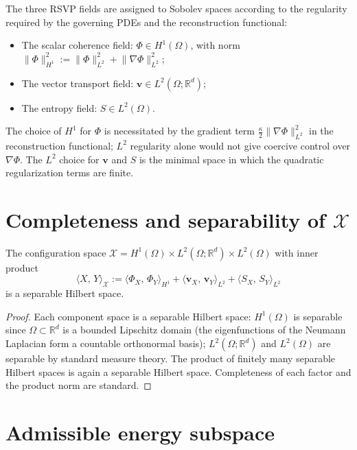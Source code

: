 \documentclass[12pt, oneside]{memoir}
\newcommand{\X}{\mathcal{X}}
\newcommand{\nnorm}[1]{\lVert #1 \rVert}
\newcommand{\ip}[2]{\langle #1,\, #2 \rangle}
\newcommand{\bv}{\mathbf{v}}
\begin{document}
The three RSVP fields are assigned to Sobolev spaces according to the regularity required
by the governing PDEs and the reconstruction functional:
\begin{itemize}
  \item The scalar coherence field: $\Phi \in H^1(\Omega)$, with norm
        $\nnorm{\Phi}_{H^1}^2 := \nnorm{\Phi}_{L^2}^2 + \nnorm{\nabla\Phi}_{L^2}^2$;
  \item The vector transport field: $\bv \in L^2(\Omega;\mathbb{R}^d)$;
  \item The entropy field: $S \in L^2(\Omega)$.
\end{itemize}
The choice of $H^1$ for $\Phi$ is necessitated by the gradient term $\frac{\kappa}{2}
\nnorm{\nabla\Phi}_{L^2}^2$ in the reconstruction functional; $L^2$ regularity alone
would not give coercive control over $\nabla\Phi$.  The $L^2$ choice for $\bv$ and $S$
is the minimal space in which the quadratic regularization terms are finite.

\section{Completeness and separability of $\X$}

\begin{proposition}[Hilbert space structure of $\X$]
\label{prop:X-hilbert}
The configuration space $\X = H^1(\Omega) \times L^2(\Omega;\mathbb{R}^d) \times
L^2(\Omega)$ with inner product
\[
  \ip{X}{Y}_\X := \ip{\Phi_X}{\Phi_Y}_{H^1} + \ip{\bv_X}{\bv_Y}_{L^2}
                  + \ip{S_X}{S_Y}_{L^2}
\]
is a separable Hilbert space.
\end{proposition}

\begin{proof}
Each component space is a separable Hilbert space: $H^1(\Omega)$ is separable since
$\Omega \subset \mathbb{R}^d$ is a bounded Lipschitz domain (the eigenfunctions of the
Neumann Laplacian form a countable orthonormal basis); $L^2(\Omega;\mathbb{R}^d)$ and
$L^2(\Omega)$ are separable by standard measure theory.  The product of finitely many
separable Hilbert spaces is again a separable Hilbert space.  Completeness of each factor
and the product norm are standard.
\end{proof}

\section{Admissible energy subspace}
\end{document}
